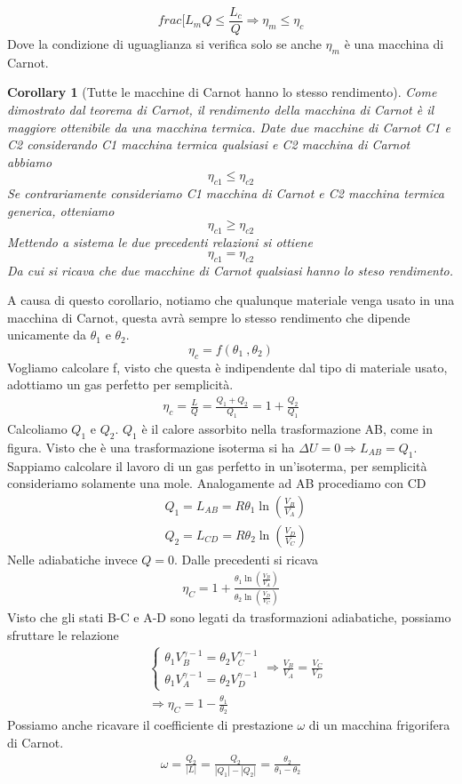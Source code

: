 \documentclass[10pt,a4paper]{article}
\newtheorem{corollary}{Corollary}[theorem]
\begin{document}
\[frac{[L_m }{Q} \leq \frac{L_c}{Q} \Rightarrow \eta_m \leq \eta_c\]
Dove la condizione di uguaglianza si verifica solo se anche $\eta_m$ è una macchina di Carnot.
\begin{corollary}[Tutte le macchine di Carnot hanno lo stesso rendimento]
Come dimostrato dal teorema di Carnot, il rendimento della macchina di Carnot è il maggiore ottenibile da una macchina termica. Date due macchine di Carnot C1 e C2 considerando C1 macchina termica qualsiasi e C2 macchina di Carnot abbiamo \[\eta_{c1}\leq \eta_{c2}\] Se contrariamente consideriamo C1 macchina di Carnot e C2 macchina termica generica, otteniamo \[\eta_{c1}\geq \eta_{c2}\] Mettendo a sistema le due precedenti relazioni si ottiene \[\eta_{c1} = \eta_{c2}\] Da cui si ricava che due macchine di Carnot qualsiasi hanno lo steso rendimento. 
\end{corollary}

A causa di questo corollario, notiamo che qualunque materiale venga usato in una macchina di Carnot, questa avrà sempre lo stesso rendimento che dipende unicamente da $\theta_1$ e $\theta_2$. 
\[\eta_ c= f(\theta_1\ ,\theta_2 )\]
Vogliamo calcolare f, visto che questa è indipendente dal tipo di materiale usato, adottiamo un gas perfetto per semplicità. 
\begin{align*}
	\eta_c = \frac{L}{Q}=\frac{Q_1 + Q_2}{Q_1}= 1 + \frac{Q_2}{Q_1}
\end{align*} 
Calcoliamo \(Q_1\) e \(Q_2\). \(Q_1\) è il calore assorbito nella trasformazione AB, come in figura. Visto che è una trasformazione isoterma si ha \(\Delta U = 0 \Rightarrow L_{AB}  = Q_1\). Sappiamo calcolare il lavoro di un gas perfetto in un'isoterma, per semplicità consideriamo solamente una mole. Analogamente ad AB procediamo con CD
\begin{align*}
	&Q_1 = L_{AB} = R\theta_1\ln(\frac{V_B}{V_A})\\
	&Q_2 = L_{CD} = R\theta_2\ln(\frac{V_D}{V_C})
\end{align*}
Nelle adiabatiche invece $Q=0$. Dalle precedenti si ricava
\begin{align*}
	\eta_C = 1+\frac{\theta_1\ln(\frac{V_B}{V_A})}{\theta_2\ln(\frac{V_D}{V_C})}
\end{align*}
Visto che gli stati B-C e A-D sono legati da trasformazioni adiabatiche, possiamo sfruttare le relazione 
\begin{align*}
	&\begin{cases}
		\theta_1 V_B^{\gamma -1} = \theta_2 V_C^{\gamma -1}\\
		\theta_1 V_A^{\gamma -1} = \theta_2 V_D^{\gamma -1}
	\end{cases}
	\Rightarrow \frac{V_B}{V_A} = \frac{V_C}{V_D}\\
	&\Rightarrow \eta_C = 1-\frac{\theta_1}{\theta_2}
\end{align*}
Possiamo anche ricavare il coefficiente di prestazione $\omega$ di un macchina frigorifera di Carnot. 
\begin{align*}
\omega = \frac{Q_2}{|L|} = \frac{Q_2}{|Q_1|-|Q_2|} = \frac{\theta_2}{\theta_1 - \theta_2}
\end{align*}
\end{document}
